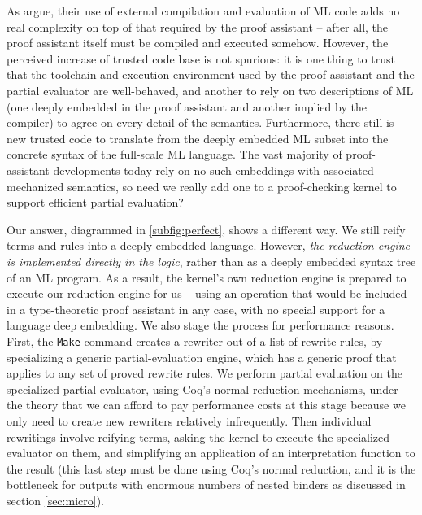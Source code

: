 As \textcite{Aehlig} argue, their use of external compilation and evaluation of ML code adds no real complexity on top of that required by the proof assistant -- after all, the proof assistant itself must be compiled and executed somehow.
However, the perceived increase of trusted code base is not spurious:
it is one thing to trust that the toolchain and execution environment used by the proof assistant and the partial evaluator are well-behaved,
and another to rely on two descriptions of ML (one deeply embedded in the proof assistant and another implied by the compiler) to agree on every detail of the semantics.
Furthermore, there still is new trusted code to translate from the deeply embedded ML subset into the concrete syntax of the full-scale ML language.
The vast majority of proof-assistant developments today rely on no such embeddings with associated mechanized semantics, so need we really add one to a proof-checking kernel to support efficient partial evaluation?

Our answer, diagrammed in \autoref{subfig:perfect}, shows a different way.
We still reify terms and rules into a deeply embedded language.
However, \emph{the reduction engine is implemented directly in the logic}, rather than as a deeply embedded syntax tree of an ML program.
As a result, the kernel's own reduction engine is prepared to execute our reduction engine for us -- using an operation that would be included in a type-theoretic proof assistant in any case, with no special support for a language deep embedding.
We also stage the process for performance reasons.
First, the \texttt{Make} command creates a rewriter out of a list of rewrite rules, by specializing a generic partial-evaluation engine, which has a generic proof that applies to any set of proved rewrite rules.
We perform partial evaluation on the specialized partial evaluator, using Coq's normal reduction mechanisms, under the theory that we can afford to pay performance costs at this stage because we only need to create new rewriters relatively infrequently.
Then individual rewritings involve reifying terms, asking the kernel to execute the specialized evaluator on them, and simplifying an application of an interpretation function to the result (this last step must be done using Coq's normal reduction, and it is the bottleneck for outputs with enormous numbers of nested binders as discussed in section \ref{sec:micro}).

